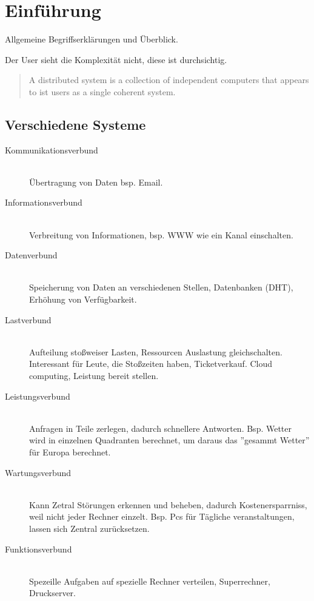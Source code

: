 \chapter{Einführung}

Allgemeine Begriffserklärungen und Überblick\cite{VS1}.

\begin{stddef} [Transparenz]
	Der User sieht die Komplexität nicht, diese ist durchsichtig.
\end{stddef}

\begin{quote}
	A distributed system is a collection of independent computers that appears to ist users as a single coherent system.
\end{quote}

\section{Verschiedene Systeme}
\begin{description}
	\item[Kommunikationsverbund] \hfill \\
		Übertragung von Daten bsp. Email.
	\item[Informationsverbund] \hfill \\
		Verbreitung von Informationen, bsp. WWW wie ein Kanal einschalten.
	\item[Datenverbund] \hfill \\
		Speicherung von Daten an verschiedenen Stellen, Datenbanken (DHT), Erhöhung von Verfügbarkeit.
	\item[Lastverbund] \hfill \\
		Aufteilung stoßweiser Lasten, Ressourcen Auslastung gleichschalten. Interessant für Leute, die Stoßzeiten haben, Ticketverkauf. Cloud computing, Leistung bereit stellen.
	\item[Leistungsverbund] \hfill \\
		Anfragen in Teile zerlegen, dadurch schnellere Antworten. Bsp. Wetter wird in einzelnen Quadranten berechnet, um daraus das ''gesammt Wetter'' für Europa berechnet.
	\item[Wartungsverbund] \hfill \\
		Kann Zetral Störungen erkennen und beheben, dadurch Kostenersparrniss, weil nicht jeder Rechner einzelt. Bsp. Pcs für Tägliche veranstaltungen, lassen sich Zentral zurücksetzen.
	\item[Funktionsverbund] \hfill \\
		Spezeille Aufgaben auf spezielle Rechner verteilen, Superrechner, Druckserver.
\end{description}


